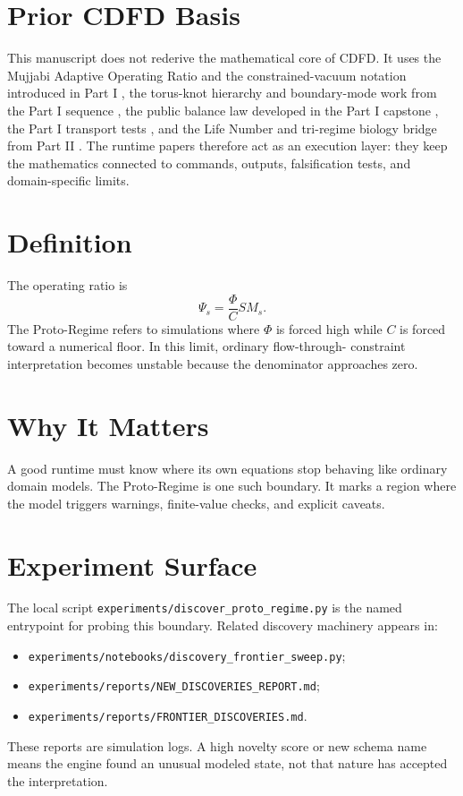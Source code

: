 \documentclass[12pt,a4paper]{article}
\begin{document}
\section{Prior CDFD Basis}
This manuscript does not rederive the mathematical core of CDFD. It uses the
Mujjabi Adaptive Operating Ratio and the constrained-vacuum notation introduced
in Part I \cite{MujjabiI2026}, the torus-knot hierarchy and boundary-mode work
from the Part I sequence \cite{MujjabiVI2026,MujjabiIX2026}, the public balance
law developed in the Part I capstone \cite{MujjabiX2026}, the Part I transport
tests \cite{MujjabiXII2026}, and the Life Number and tri-regime biology bridge
from Part II \cite{MujjabiPartII2026}. The runtime papers therefore act as an
execution layer: they keep the mathematics connected to commands, outputs,
falsification tests, and domain-specific limits.


\section{Definition}
The operating ratio is
\begin{equation}
    \Psi_s=\frac{\Phi}{C}S M_s.
\end{equation}
The Proto-Regime refers to simulations where $\Phi$ is forced high while
$C$ is forced toward a numerical floor. In this limit, ordinary flow-through-
constraint interpretation becomes unstable because the denominator approaches
zero.

\section{Why It Matters}
A good runtime must know where its own equations stop behaving like ordinary
domain models. The Proto-Regime is one such boundary. It marks a region where
the model triggers warnings, finite-value checks, and explicit caveats.

\section{Experiment Surface}
The local script \texttt{experiments/discover\_proto\_regime.py} is the named
entrypoint for probing this boundary. Related discovery machinery appears in:
\begin{itemize}
    \item \texttt{experiments/notebooks/discovery\_frontier\_sweep.py};
    \item \texttt{experiments/reports/NEW\_DISCOVERIES\_REPORT.md};
    \item \texttt{experiments/reports/FRONTIER\_DISCOVERIES.md}.
\end{itemize}
These reports are simulation logs. A high novelty score or new
schema name means the engine found an unusual modeled state, not that nature has
accepted the interpretation.
\end{document}
